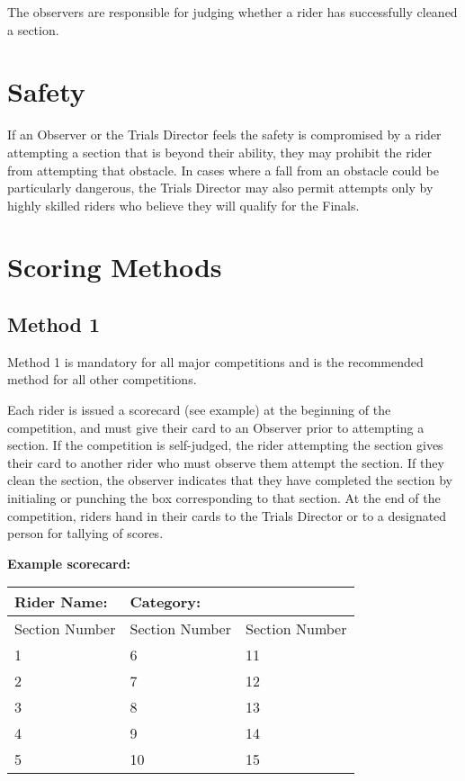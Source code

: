 The observers are responsible for judging whether a rider has successfully cleaned a section.

\section{Safety}

If an Observer or the Trials Director feels the safety is compromised by a rider attempting a section that is beyond their ability, they may prohibit the rider from attempting that obstacle.
In cases where a fall from an obstacle could be particularly dangerous, the Trials Director may also permit attempts only by highly skilled riders who believe they will qualify for the Finals.

\section{Scoring Methods}

\subsection{Method 1}
Method 1 is mandatory for all major competitions and is the recommended method for all other competitions.

Each rider is issued a scorecard (see example) at the beginning of the competition, and must give their card to an Observer prior to attempting a section.
If the competition is self-judged, the rider attempting the section gives their card to another rider who must observe them attempt the section.
If they clean the section, the observer indicates that they have completed the section by initialing or punching the box corresponding to that section. 
At the end of the competition, riders hand in their cards to the Trials Director or to a designated person for tallying of scores.

\textbf{Example scorecard:}

\begin{tabular}{|l|l|l|}
\hline 
\textbf{Rider Name:} & \textbf{Category:} &  \\ 
\hline 
Section Number  & Section Number  & Section Number \\ 
\hline 
1 & 6 & 11 \\ 
\hline 
2 & 7 & 12 \\ 
\hline 
3 & 8 & 13 \\ 
\hline 
4 & 9 & 14 \\ 
\hline 
5 & 10 & 15 \\ 
\hline 
\end{tabular}

